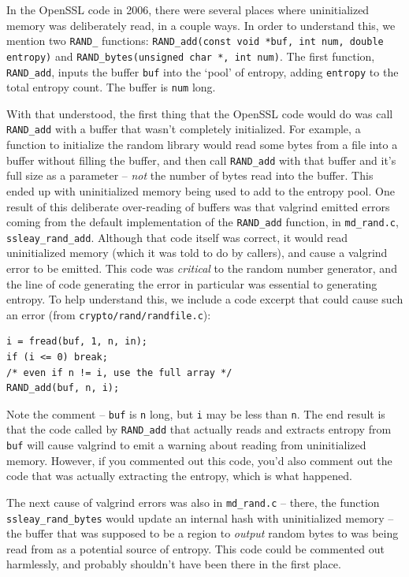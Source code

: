 \documentclass[conference]{IEEEtran}
\begin{document}
In the OpenSSL code in 2006, there were several places where
uninitialized memory was deliberately read, in a couple ways. In order
to understand this, we mention two \verb|RAND_| functions:
\verb|RAND_add(const void *buf, int num, double entropy)| and
\verb|RAND_bytes(unsigned char *, int num)|. The first function,
\verb|RAND_add|, inputs the buffer \verb|buf| into the `pool' of
entropy, adding \verb|entropy| to the total entropy count. The buffer
is \verb|num| long.

With that understood, the first thing that the OpenSSL code would do
was call \verb|RAND_add| with a buffer that wasn't completely
initialized\cite{3}. For example, a function to initialize the random
library would read some bytes from a file into a buffer without
filling the buffer, and then call \verb|RAND_add| with that buffer and
it's full size as a parameter -- \emph{not} the number of bytes read
into the buffer. This ended up with uninitialized memory being used to
add to the entropy pool. One result of this deliberate over-reading of
buffers was that valgrind emitted errors coming from the default
implementation of the \verb|RAND_add| function, in \verb|md_rand.c|,
\verb|ssleay_rand_add|. Although that code itself was correct, it
would read uninitialized memory (which it was told to do by callers),
and cause a valgrind error to be emitted. This code was
\emph{critical} to the random number generator, and the line of code
generating the error in particular was essential to generating
entropy. To help understand this, we include a code excerpt that could
cause such an error (from \verb|crypto/rand/randfile.c|):

\begin{verbatim}
i = fread(buf, 1, n, in);
if (i <= 0) break;
/* even if n != i, use the full array */
RAND_add(buf, n, i);
\end{verbatim}

Note the comment -- \verb|buf| is \verb|n| long, but \verb|i| may be
less than \verb|n|. The end result is that the code called by
\verb|RAND_add| that actually reads and extracts entropy from
\verb|buf| will cause valgrind to emit a warning about reading from
uninitialized memory. However, if you commented out this code, you'd
also comment out the code that was actually extracting the entropy,
which is what happened.

The next cause of valgrind errors was also in
\verb|md_rand.c| -- there, the function \verb|ssleay_rand_bytes| would
update an internal hash with uninitialized memory -- the buffer that
was supposed to be a region to \emph{output} random bytes to was being
read from as a potential source of entropy. This code could be
commented out harmlessly, and probably shouldn't have been there in
the first place.
\end{document}

